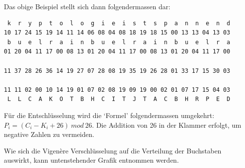 \documentclass[
  nswissgerman,
  a4paper,
  DIV=11,
  numbers=noendperiod,
  ngerman]{scrreprt}
\begin{document}
Das obige Beispiel stellt sich dann folgendermassen dar:

\begin{verbatim}
 k  r  y  p  t  o  l  o  g  i  e  i  s  t  s  p  a  n  n  e  n  d
10 17 24 15 19 14 11 14 06 08 04 08 18 19 18 15 00 13 13 04 13 03
 b  u  e  l  r  a  i  n  b  u  e  l  r  a  i  n  b  u  e  l  r  a
01 20 04 11 17 00 08 13 01 20 04 11 17 00 08 13 01 20 04 11 17 00

11 37 28 26 36 14 19 27 07 28 08 19 35 19 26 28 01 33 17 15 30 03

11 11 02 00 10 14 19 01 07 02 08 19 09 19 00 02 01 07 17 15 04 03
 L  L  C  A  K  O  T  B  H  C  I  T  J  T  A  C  B  H  R  P  E  D
\end{verbatim}

Für die Entschlüsselung wird die `Formel' folgendermassen umgekehrt:
\(P_i = (C_i - K_i + 26)\ mod\ 26\). Die Addition von 26 in der Klammer
erfolgt, um negative Zahlen zu vermeiden.

Wie sich die Vigenère Verschlüsselung auf die Verteilung der Buchstaben
auswirkt, kann untenstehender Grafik entnommen werden.
\end{document}
